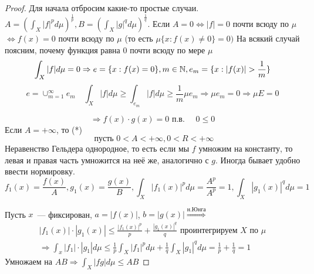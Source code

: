 \documentclass[document]{subfiles}
\begin{document}
\begin{proof}
Для начала отбросим какие-то простые случаи. \\
$A = \left( \int_X |f|^p d \mu \right)^{\frac{1}{p}}, B = \left( \int_X |g|^q d \mu \right)^{\frac{1}{q}}$.
Если $A = 0 \Leftrightarrow |f| = 0$ почти всюду по $\mu$ $\Leftrightarrow f(x) = 0$ почти всюду по $\mu$ (то есть $\mu \{x: f(x) \ne 0 \} = 0)$
На всякий случай поясним, почему функция равна 0 почти всюду по мере $\mu$
\[ \int_X |f| d \mu = 0 \Rightarrow e = \{x: f(x) = 0 \}, m \in \mathbb{N}, e_m = \{x: |f(x)| > \frac{1}{m} \} \]
\[e = \cup^\infty_{m=1} e_m \quad \int_X |f| d \mu \geq \int_{e_m} |f| d\mu \geq \frac{1}{m} \mu e_m \Rightarrow \mu e_m = 0 \Rightarrow \mu E = 0 \]

\[ \Rightarrow f(x) \cdot g(x) = 0 \text { п.в. } \quad 0 \leq 0 \tag{*} \]
Если $A = +\infty$, то (*) 
\[ \text{ пусть } 0 < A < +\infty, 0 < R < +\infty \]
Неравенство Гельдера однородное, то есть если мы $f$ умножим на константу, то левая и правая часть умножится на неё же, аналогично с $g$. Иногда
бывает удобно ввести нормировку.
\[ f_1(x) = \frac{f(x)}{A}, g_1(x) = \frac{g(x)}{B}, \int_X |f_1(x)|^p d\mu = \frac{A^p}{A^p} = 1, \int_X |g_1(x)|^q d \mu = 1 \]

Пусть $x$~--- фиксирован, $a = |f(x)|$, $b = |g(x)| \stackrel{\text{н.Юнга}}{\Rightarrow}$ 
\begin{multline*}
    |f_1(x)| \cdot |g_1(x)| \leq \frac{|f_1(x)|^p}{p} + \frac{|g_1(x)|^q}{q} \text{ проинтегрируем } X \text { по } \mu \\
    \Rightarrow \int_x |f_1| \cdot |g_1| d \mu \leq \frac{1}{p} \int_X |f_1|^p d\mu + \frac{1}{q} \int_X |g_1|^q d\mu = \frac{1}{p} + \frac{1}{q} = 1
\end{multline*}
Умножаем на $AB \Rightarrow \int_X |fg| d \mu \leq AB $
\end{proof}
\end{document}

